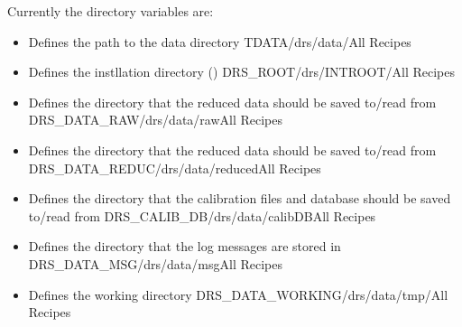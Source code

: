 Currently the directory variables are:

\begin{itemize}

\item {}
{Defines the path to the data directory}
{TDATA}{/drs/data/}{All Recipes}{\configtxtfile}

\item {}
{Defines the instllation directory (\InstallDIR)}
{DRS\_ROOT}{/drs/INTROOT/}{All Recipes}{\configtxtfile}

\item {}
{Defines the directory that the reduced data should be saved to/read from}
{DRS\_DATA\_RAW}{/drs/data/raw}{All Recipes}{\configtxtfile}

\item {}
{Defines the directory that the reduced data should be saved to/read from}
{DRS\_DATA\_REDUC}{/drs/data/reduced}{All Recipes}{\configtxtfile}

\item {}
{Defines the directory that the calibration files and database should be saved to/read from}
{DRS\_CALIB\_DB}{/drs/data/calibDB}{All Recipes}{\configtxtfile}

\item {}
{Defines the directory that the log messages are stored in}
{DRS\_DATA\_MSG}{/drs/data/msg}{All Recipes}{\configtxtfile}

\item {}
{Defines the working directory}
{DRS\_DATA\_WORKING}{/drs/data/tmp/}{All Recipes}{\configtxtfile}

\end{itemize}

